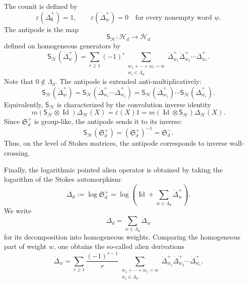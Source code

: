 \documentclass[11pt]{amsart}
\DeclareMathOperator{\Id}{Id}
\theoremstyle{plain}
\begin{document}
The counit is defined by
\begin{equation*}\label{eq:dotDelta-plus-counit}
\varepsilon(\dot\Delta_{\emptyset}^{+})=1,
\qquad
\varepsilon(\dot\Delta_{\underline{w}}^{+})=0
\quad
\text{for every nonempty word } \underline{w}.
\end{equation*}
The antipode is the map
\[
\mathsf S_{\mathcal H}:\mathcal H_d\to\mathcal H_d
\]
defined on homogeneous generators by
\begin{equation*}\label{eq:dotDelta-plus-antipode-generator}
\mathsf S_{\mathcal H}(\dot\Delta_w^+)
=
\sum_{r\ge1}(-1)^r
\sum_{\substack{w_1+\cdots+w_r=w\\
w_i\in\Lambda_d}}
\dot\Delta_{w_1}^+\dot\Delta_{w_2}^+\cdots\dot\Delta_{w_r}^+ .
\end{equation*}
Note that $0\notin\Lambda_d$. The antipode is extended anti-multiplicatively:
\begin{equation*}\label{eq:dotDelta-plus-antipode-word}
\mathsf S_{\mathcal H}
\left(
\dot\Delta_{\underline{w}}^{+}
\right)
=
\mathsf S_{\mathcal H}
\left(
\dot\Delta_{w_r}^{+}\cdots\dot\Delta_{w_1}^{+}
\right)
=
\mathsf S_{\mathcal H}(\dot\Delta_{w_1}^{+})
\cdots
\mathsf S_{\mathcal H}(\dot\Delta_{w_r}^{+}).
\end{equation*}
Equivalently, \(\mathsf S_{\mathcal H}\) is characterized by the convolution
inverse identity
\[
m(\mathsf S_{\mathcal H}\otimes\Id)\Delta_{\mathcal H}(X)
=
\varepsilon(X)1
=
m(\Id\otimes\mathsf S_{\mathcal H})\Delta_{\mathcal H}(X).
\]
Since \(\mathfrak S_d^+\) is group-like, the antipode sends it to its inverse:
\begin{equation*}\label{eq:antipode-Stokes-inverse}
\mathsf S_{\mathcal H}(\mathfrak S_d^+)
=
(\mathfrak S_d^+)^{-1}
=
\mathfrak S_d^- .
\end{equation*}
Thus, on the level of Stokes matrices, the antipode corresponds to inverse
wall-crossing.

Finally, the logarithmic pointed alien operator is obtained by taking the
logarithm of the Stokes automorphism:
\begin{equation}\label{eq:dotDelta-log-Stokes}
\dot\Delta_d
:=
\log \mathfrak S_d^+
=
\log\left(\Id+\sum_{w\in\Lambda_d}\dot\Delta_w^+\right).
\end{equation}
We write
\[
\dot\Delta_d=\sum_{w\in\Lambda_d}\dot\Delta_w
\]
for its decomposition into homogeneous weights.  Comparing the homogeneous
part of weight \(w\), one obtains the so-called alien derivations
\begin{equation}\label{eq:dotDelta-from-dotDelta-plus}
\dot\Delta_w
=
\sum_{r\ge1}\frac{(-1)^{r-1}}{r}
\sum_{\substack{w_1+\cdots+w_r=w\\ w_i\in\Lambda_d}}
\dot\Delta_{w_1}^+\dot\Delta_{w_2}^+\cdots\dot\Delta_{w_r}^+ .
\end{equation}
\end{document}

